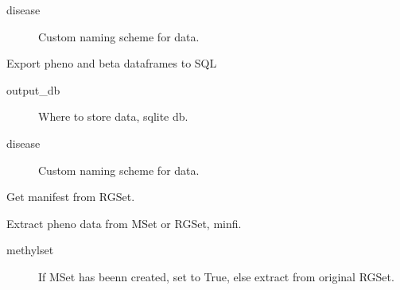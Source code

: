 \documentclass[letterpaper,10pt,english]{sphinxmanual}
\begin{document}
\begin{fulllineitems}
\begin{fulllineitems}
\begin{description}
\item[{disease}] \leavevmode
Custom naming scheme for data.

\end{description}

\end{fulllineitems}


\begin{fulllineitems}
\label{\detokenize{index:pymethylprocess.PreProcessDataTypes.PreProcessIDAT.export_sql}}
Export pheno and beta dataframes to SQL
\begin{description}
\item[{output\_db}] \leavevmode
Where to store data, sqlite db.

\item[{disease}] \leavevmode
Custom naming scheme for data.

\end{description}

\end{fulllineitems}


\begin{fulllineitems}
\label{\detokenize{index:pymethylprocess.PreProcessDataTypes.PreProcessIDAT.extract_manifest}}
Get manifest from RGSet.

\end{fulllineitems}


\begin{fulllineitems}
\label{\detokenize{index:pymethylprocess.PreProcessDataTypes.PreProcessIDAT.extract_pheno_data}}
Extract pheno data from MSet or RGSet, minfi.
\begin{description}
\item[{methylset}] \leavevmode
If MSet has beenn created, set to True, else extract from original RGSet.


\end{description}
\end{fulllineitems}
\end{fulllineitems}
\end{document}
